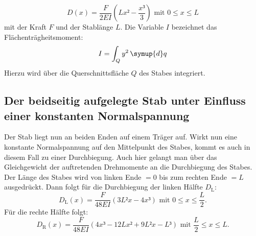    \begin{equation}
     D(x) = \frac{F}{2EI}\left(Lx² - \frac{x³}{3}\right) \text{ mit }0 \leq x \leq L
     \end{equation}
     mit der Kraft $F$ und der Stablänge $L$. Die Variable $I$ bezeichnet das
     Flächenträgheitsmoment:
\begin{equation}
  I = \int_{Q}^{}y^2 \, \symup{d}q
\end{equation}
Hierzu wird über die Querschnittsfläche $Q$ des Stabes integriert.

\subsection{Der beidseitig aufgelegte Stab unter Einfluss einer konstanten Normalspannung}
Der Stab liegt nun an beiden Enden auf einem Träger auf. Wirkt nun eine
 konstante Normalspannung auf den Mittelpunkt des Stabes, kommt es auch in diesem Fall
  zu einer Durchbiegung.
 Auch hier gelangt man über das Gleichgewicht der auftretenden Drehmomente an die Durchbiegung des Stabes.
 Der Länge des Stabes wird von linken Ende $ = 0$ bis zum rechten Ende $= L$ ausgedrückt.
    Dann folgt für die Durchbiegung der linken Hälfte $D_\text{L}$:
  \begin{equation}
    D_\text{L}(x) = \frac{F}{48 EI}\left(3L²x-4x³\right) \text{ mit } 0 \leq x \leq \frac{L}{2}\text{.}
  \end{equation}
Für die rechte Hälfte folgt:
\begin{equation}
  D_\text{R}(x) = \frac{F}{48EI}\left(4x³ -12Lx² +9L²x-L³\right) \text{ mit } \frac{L}{2} \leq x \leq L\text{.}
\end{equation}
